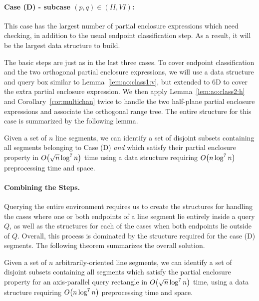\paragraph{Case (D) - subcase $(p, q) \in (II, VI)$:} 
This case has the largest number of partial enclosure expressions which need checking, in addition to the usual endpoint classification step. 
As a result, it will be the largest data structure to build.

The basic steps are just as in the last three cases. 
To cover endpoint classification and the two orthogonal partial enclosure expressions, we will use a data structure and query box similar to Lemma~\ref{lem:ao:class1:v}, but extended to 6D to cover the extra partial enclosure expression.
We then apply Lemma~\ref{lem:ao:class2:h} and Corollary~\ref{cor:multichan} twice to handle the two half-plane partial enclosure expressions and associate the orthogonal range tree. 
The entire structure for this case is summarized by the following lemma.

\begin{lemma}
\label{lem:ao:class4:c}
Given a set of $n$ line segments, we can identify a set of disjoint subsets containing all segments belonging to Case (D) \emph{and} which satisfy their partial enclosure property in $O\!\left(\sqrt{n}\log^7{n}\right)$ time using a data structure requiring $O\!\left(n\log^7{n}\right)$ preprocessing time and space.
\end{lemma}


\paragraph{Combining the Steps.} 

Querying the entire environment requires us to create the structures for handling the cases where one or both endpoints of a line segment lie entirely inside a query $Q$, as well as the structures for each of the cases when both endpoints lie outside of $Q$. 
Overall, this process is dominated by the structure required for the case (D) segments. 
The following theorem summarizes the overall solution.

\begin{theorem}
\label{th:ao}
Given a set of $n$ arbitrarily-oriented line segments, we can identify a set of disjoint subsets containing all segments which satisfy the partial enclosure property for an axis-parallel query rectangle in $O\!\left(\sqrt{n}\log^7{n}\right)$ time, using a data structure requiring $O\!\left(n\log^7{n}\right)$ preprocessing time and space.
\end{theorem}


